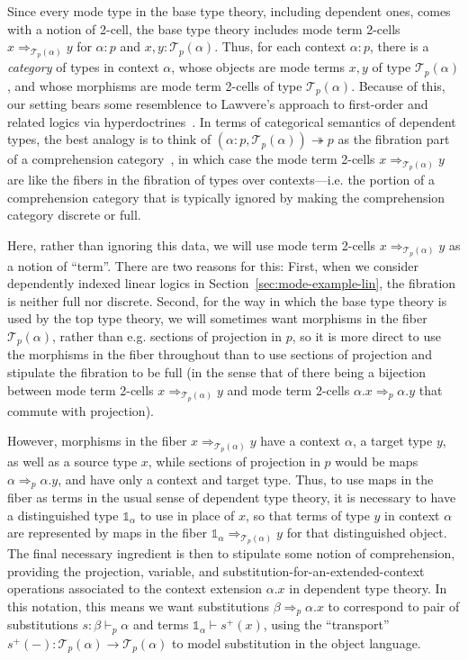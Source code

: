 \documentclass[10pt]{article}
\theoremstyle{definition}
\newcommand{\tcell}{\Rightarrow}
\newcommand{\sigmacl}[3]{\ensuremath{(#1{:}#2,#3)}}
\newcommand\TrPlus[2]{\ensuremath{{#1}^+(#2)}}
\newcommand\El[2]{\mathcal{T}_{#1}(#2)}
\newcommand\One{\ensuremath{\mathds{1}}}
\begin{document}
Since every mode type in the base type theory, including dependent ones,
comes with a notion of 2-cell, the base type theory includes mode term
2-cells $x \tcell_{\El p \alpha} y$ for $\alpha : p$ and $x,y : \El p
\alpha$.  Thus, for each context $\alpha : p$, there is a \emph{category} of
types in context $\alpha$, whose objects are mode terms $x,y$ of type
$\El{p}{\alpha}$, and whose morphisms are mode term 2-cells of type
$\El{p}{\alpha}$.  Because of this, our setting bears some resemblence
to Lawvere's approach to first-order and related logics via
hyperdoctrines~\citep{lawvere70comprehension}.  In terms of categorical
semantics of dependent types, the best analogy is to think of
$\sigmacl{\alpha}{p}{\El{p}{\alpha}} \twoheadrightarrow p$ as the
fibration part of a comprehension category~\citep{jacobs93compcat}, in
which case the mode term 2-cells $x \tcell_{\El p \alpha} y$ are like
the fibers in the fibration of types over contexts---i.e. the portion of
a comprehension category that is typically ignored by making the
comprehension category discrete or full.

Here, rather than ignoring this data, we will use mode term 2-cells $x
\tcell_{\El p \alpha} y$ as a notion of ``term''.  There are two reasons
for this: First, when we consider dependently indexed linear logics in
Section~\ref{sec:mode-example-lin}, the fibration is neither full nor
discrete.  Second, for the way in which the base type theory is used by
the top type theory, we will sometimes want morphisms in the fiber
$\El{p}{\alpha}$, rather than e.g. sections of projection in $p$, so it
is more direct to use the morphisms in the fiber throughout than to use
sections of projection and stipulate the fibration to be full (in the
sense that of there being a bijection between mode term 2-cells $x
\tcell_{\El{p}{\alpha}} y$ and mode term 2-cells $\alpha.x \tcell_p
\alpha.y$ that commute with projection).

However, morphisms in the fiber $x \tcell_{\El p \alpha} y$ have a
context $\alpha$, a target type $y$, as well as a source type $x$, while
sections of projection in $p$ would be maps $\alpha \tcell_p \alpha.y$,
and have only a context and target type.  Thus, to use maps in the fiber
as terms in the usual sense of dependent type theory, it is necessary to
have a distinguished type $\One_\alpha$ to use in place of $x$, so that
terms of type $y$ in context $\alpha$ are represented by maps in the
fiber $\One_\alpha \tcell_{\El p \alpha} y$ for that distinguished
object.  The final necessary ingredient is then to stipulate some notion
of comprehension, providing the projection, variable, and
substitution-for-an-extended-context operations associated to the
context extension $\alpha.x$ in dependent type theory.  In this
notation, this means we want substitutions $\beta \tcell_p \alpha.x$ to
correspond to pair of substitutions $s : \beta \vdash_p \alpha$ and
terms $\One_\alpha \vdash \TrPlus{s}{x}$, using the ``transport''
$\TrPlus{s}{-} : \El{p}{\alpha} \to \El{p}{\alpha}$ to model substitution
in the object language.
\end{document}
